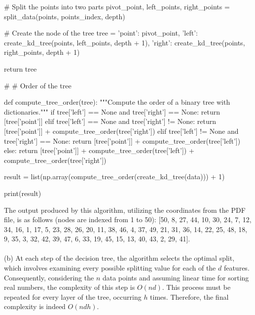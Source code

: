 \begin{Python}
        # Split the points into two parts
        pivot_point, left_points, right_points = split_data(points, points_index, depth)
    
        # Create the node of the tree
        tree = {
            'point': pivot_point,
            'left': create_kd_tree(points, left_points, depth + 1),
            'right': create_kd_tree(points, right_points, depth + 1)
        }
    
        return tree
    
    #%
    # Order of the tree
    
    def compute_tree_order(tree):
        """Compute the order of a binary tree with dictionaries."""
        if tree['left'] == None and tree['right'] == None:
            return [tree['point']]
        elif tree['left'] == None and tree['right'] != None:
            return [tree['point']] + compute_tree_order(tree['right'])
        elif tree['left'] != None and tree['right'] == None:
            return [tree['point']] + compute_tree_order(tree['left']) 
        else:
            return [tree['point']] + compute_tree_order(tree['left']) + compute_tree_order(tree['right'])
    
    result = list(np.array(compute_tree_order(create_kd_tree(data))) + 1)
    
    print(result)
\end{Python}
The output produced by this algorithm, utilizing the coordinates from the PDF file, is as follows (nodes are indexed from 1 to 50): 
[50, 8, 27, 44, 10, 30, 24, 7, 12, 34, 16, 1, 17, 5, 23, 28, 26, 20, 11, 38, 46, 4, 37, 49, 21, 31, 36, 14, 22, 25, 48, 18, 9, 35, 3, 32, 42, 39, 47, 6, 33, 19, 45, 15, 13, 40, 43, 2, 29, 41].\\ \\
(b) At each step of the decision tree, the algorithm selects the optimal split, which involves examining every possible splitting value for each of the $d$ features. Consequently, considering the $n$ data points and assuming linear time for sorting real numbers, the complexity of this step is $O(nd)$. This process must be repeated for every layer of the tree, occurring $h$ times. Therefore, the final complexity is indeed $O(ndh)$.
